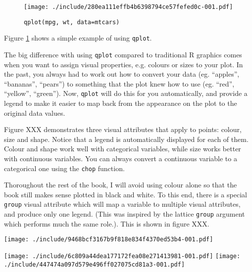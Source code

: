 \begin{figure}[htbp]
	\begin{center}
\texttt{[image: ./include/280ea111effb4b6398794ce57fefed0c-001.pdf]}
	\end{center}
	\caption{{\tt qplot(mpg, wt, data=mtcars)}}
	
	\label{fig:first}
\end{figure}

Figure \ref{fig:first} shows a simple example of using {\tt qplot}.

The big difference with using {\tt qplot} compared to traditional R graphics comes when you want to assign visual properties, e.g. colours or sizes to your plot.  In the past, you always had to work out how to convert your data (eg. ``apples'', ``bananas'', ``pears'') to something that the plot knew how to use (eg. ``red'', ``yellow'', ``green'').  Now, {\tt qplot} will do this for you automatically, and provide a legend to make it easier to map back from the appearance on the plot to the original data values.

Figure XXX demonstrates three visual attributes that apply to points: colour, size and shape.   Notice that a legend is automatically displayed for each of them.  Colour and shape work well with categorical variables, while size works better with continuous variables.  You can always convert a continuous variable to a categorical one using the {\tt chop} function.

Thoroughout the rest of the book, I will avoid using colour alone so that the book still makes sense plotted in black and white.  To this end, there is a special {\tt group} visual attribute which will map a variable to multiple visual attributes, and produce only one legend.  (This was inspired by the lattice {\tt group} argument which performs much the same role.).  This is shown in figure XXX.

\texttt{[image: ./include/9468bcf3167b9f818e834f4370ed53b4-001.pdf]}

\texttt{[image: ./include/6c809a44dea177172fea08e271413981-001.pdf]}
\texttt{[image: ./include/447474a097d579e496ff027075cd81a3-001.pdf]}

